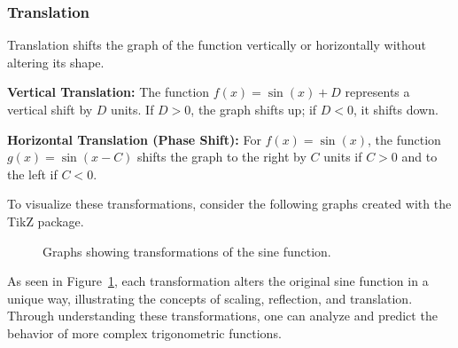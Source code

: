 \documentclass[a4paper,12pt]{book}
\begin{document}

\subsubsection{Translation}
Translation shifts the graph of the function vertically or horizontally without altering its shape.

\textbf{Vertical Translation:} The function \( f(x) = \sin(x) + D \) represents a vertical shift by \( D \) units. If \( D > 0 \), the graph shifts up; if \( D < 0 \), it shifts down.

\textbf{Horizontal Translation (Phase Shift):} For \( f(x) = \sin(x) \), the function \( g(x) = \sin(x - C) \) shifts the graph to the right by \( C \) units if \( C > 0 \) and to the left if \( C < 0 \).

To visualize these transformations, consider the following graphs created with the TikZ package.


\begin{figure}[htbp]
\centering
{}
\caption{Graphs showing transformations of the sine function.}
\label{fig:sine_transformations}
\end{figure}

As seen in Figure~\ref{fig:sine_transformations}, each transformation alters the original sine function in a unique way, illustrating the concepts of scaling, reflection, and translation. Through understanding these transformations, one can analyze and predict the behavior of more complex trigonometric functions.
\end{document}
